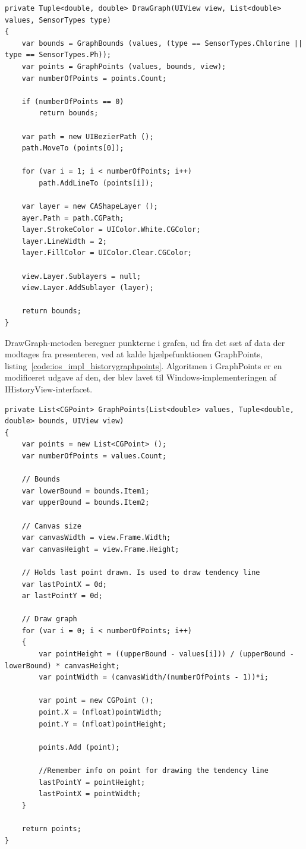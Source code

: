 \begin{lstlisting}[caption={DrawGraph(...)},label={code:ios_impl_historydrawgraph}]
private Tuple<double, double> DrawGraph(UIView view, List<double> values, SensorTypes type)
{
	var bounds = GraphBounds (values, (type == SensorTypes.Chlorine || type == SensorTypes.Ph));
	var points = GraphPoints (values, bounds, view);
	var numberOfPoints = points.Count;

	if (numberOfPoints == 0)
		return bounds;

	var path = new UIBezierPath ();
	path.MoveTo (points[0]);

	for (var i = 1; i < numberOfPoints; i++)
		path.AddLineTo (points[i]);

	var layer = new CAShapeLayer ();
	ayer.Path = path.CGPath;
	layer.StrokeColor = UIColor.White.CGColor;
	layer.LineWidth = 2;
	layer.FillColor = UIColor.Clear.CGColor;

	view.Layer.Sublayers = null;
	view.Layer.AddSublayer (layer);

	return bounds;
}
\end{lstlisting}

DrawGraph-metoden beregner punkterne i grafen, ud fra det sæt af data der modtages fra presenteren, ved at kalde hjælpefunktionen GraphPoints, listing~\ref{code:ios_impl_historygraphpoints}. Algoritmen i GraphPoints er en modificeret udgave af den, der blev lavet til Windows-implementeringen af IHistoryView-interfacet.

\begin{lstlisting}[caption={GraphPoints(...)},label={code:ios_impl_historygraphpoints}]
private List<CGPoint> GraphPoints(List<double> values, Tuple<double, double> bounds, UIView view)
{
	var points = new List<CGPoint> ();
	var numberOfPoints = values.Count;

	// Bounds
	var lowerBound = bounds.Item1;
	var upperBound = bounds.Item2;

	// Canvas size
	var canvasWidth = view.Frame.Width;
	var canvasHeight = view.Frame.Height;

	// Holds last point drawn. Is used to draw tendency line
	var lastPointX = 0d;
	ar lastPointY = 0d;

	// Draw graph
	for (var i = 0; i < numberOfPoints; i++)
	{
		var pointHeight = ((upperBound - values[i])) / (upperBound - lowerBound) * canvasHeight;
		var pointWidth = (canvasWidth/(numberOfPoints - 1))*i;

		var point = new CGPoint ();
		point.X = (nfloat)pointWidth;
		point.Y = (nfloat)pointHeight;
		
		points.Add (point);

		//Remember info on point for drawing the tendency line
		lastPointY = pointHeight;
		lastPointX = pointWidth;
	}

	return points;
}
\end{lstlisting}

